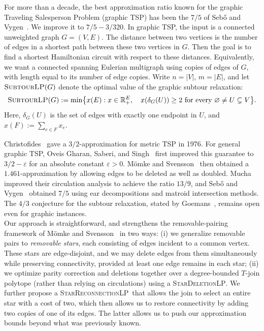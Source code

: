 \documentclass[11pt]{amsart}
\newcommand{\1}{\mathbbm{1}}
\newcommand{\SubtourLP}{\textsc{SubtourLP}}
\newcommand{\LPone}{\textsc{StarDeletionLP}}
\newcommand{\LPtwo}{\textsc{StarReconnectionLP}}
\begin{document}
For more than a decade, the best approximation ratio known for the graphic Traveling Salesperson Problem (graphic TSP) has been the $7/5$ of Seb\H{o} and Vygen~\cite{SeboVygen}. We improve it to $7/5-3/320$.
In graphic TSP, the input is a connected
unweighted graph $G=(V,E)$. The distance between two vertices is the number of edges in a shortest path between these two vertices in $G$. Then the goal is to find a shortest Hamiltonian circuit with respect to these distances. Equivalently, we want a connected spanning
Eulerian multigraph using copies of edges of $G$, with length equal to
its number of edge copies.
{Write $n=|V|$, $m=|E|$, and let $\text{\SubtourLP}(G)$ denote the optimal value of the graphic subtour relaxation:}
\begin{equation}
    \label{eqn:SEP}
 {\text{\SubtourLP}(G)}:=\min\bigl\{x(E):x\in\mathbb R_{+}^{E},\quad
 x(\delta_G(U))\ge2\text{ for every }
 \varnothing\ne U\subsetneq V\bigr\}.
\end{equation}
Here, $\delta_G(U)$ is the set of edges with exactly one endpoint in $U$, and $x(F):=\sum_{e\in F}x_e$. 

Christofides~\cite{Chr76} gave a $3/2$-approximation for metric TSP
in 1976. For general graphic TSP, Oveis Gharan, Saberi, and
Singh~\cite{GSS11} first improved this guarantee to
$3/2-\varepsilon$ for an absolute constant $\varepsilon>0$.
M\"omke and Svensson~\cite{MomkeSvensson} then obtained a $1.461$-approximation by allowing edges to be deleted as well as doubled.
Mucha~\cite{Mucha} improved their circulation analysis to achieve the ratio $13/9$,
and Seb\H{o} and Vygen~\cite{SeboVygen} obtained $7/5$ using ear
decompositions and matroid intersection methods. The $4/3$ conjecture for the
subtour relaxation, stated by Goemans~\cite[Conjecture~1]{Goemans95},
remains open even for graphic instances. \\

Our approach is straightforward, and strengthens the removable-pairing framework of
M\"omke and Svensson~\cite{MomkeSvensson} in two ways:
(i) we generalize removable pairs to \emph{removable stars},
each consisting of edges incident to a common vertex.
These stars are edge-disjoint, and we may delete edges
from them simultaneously while preserving connectivity,
provided at least one edge remains in each star;
(ii) we optimize parity correction and deletions together over a degree-bounded $T$-join polytope (rather than relying on circulations) using a \LPone. We further propose a \LPtwo\  that allows the join to select an entire star with a cost of two, which then allows us to restore connectivity by adding two copies of one of its edges. The latter allows us to push our approximation bounds beyond what was previously known.
\end{document}

